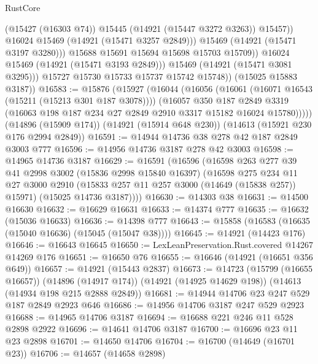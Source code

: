 \begin{lexlean}{RustCore}
\begin{coremodule}
                          (@15427 (@16303 @74))
                          @15445
                          (@14921 (@15447 @3272 @3263))
                          @15457))
                      @16024
                      @15469
                      (@14921 (@15471 @3257 @2849)))
                    @15469
                    (@14921 (@15471 @3197 @3280)))
                  @15688
                  @15691
                  @15694
                  @15698
                  @15703
                  @15709))
              @16024
              @15469
              (@14921 (@15471 @3193 @2849)))
            @15469
            (@14921 (@15471 @3081 @3295)))
          @15727
          @15730
          @15733
          @15737
          @15742
          @15748))
      (@15025 @15883 @3187))
@16583 := @15876
    (@15927
      (@16044
        (@16056
          (@16061 (@16071 @16543 (@15211 (@15213 @301 @187 @3078))))
          (@16057
            @350
            @187
            @2849
            @3319
            (@16063 @198 @187 @234 @27 @2849 @2910 @3317 @15182 @16024 @15780)))))
    (@14896 (@15909 @174))
    (@14921 (@15914 @648 @230))
    (@14613 (@15921 @230 @176 @2994 @2849))
@16591 := @14944 @14736 @38 @278 @42 @187 @2849 @3003 @777
@16596 := @14956 @14736 @3187 @278 @42 @3003
@16598 := @14965 @14736 @3187
@16629 := @16591
    (@16596
      (@16598
        @263
        @277
        @39
        @41
        @2998
        @3002
        (@15836 @2998 @15840 @16397)
        (@16598
          @275
          @234
          @11
          @27
          @3000
          @2910
          (@15833 @257 @11 @257 @3000 (@14649 (@15838 @257)) @15971)
          (@15025 @14736 @3187))))
@16630 := @14303 @38
@16631 := @14500 @16630
@16632 := @16629 @16631
@16633 := @14374 @777
@16635 := @16632 (@15036 @16633)
@16636 := @14398 @777
@16643 := @15858 (@16583 (@16635 (@15040 @16636) (@15045 (@15047 @38))))
@16645 := @14921 (@14423 @176)
@16646 := @16643 @16645
@16650 := LexLeanPreservation.Rust.covered @14267 @14269 @176
@16651 := @16650 @76
@16655 := @16646 (@14921 (@16651 @356 @649))
@16657 := @14921 (@15443 @2837)
@16673 := @14723
    (@15799 (@16655 @16657))
    (@14896 (@14917 @174))
    (@14921 (@14925 @14629 @198))
    (@14613 (@14934 @198 @215 @2888 @2849))
@16681 := @14944 @14706 @23 @247 @529 @187 @2849 @2923 @646
@16686 := @14956 @14706 @3187 @247 @529 @2923
@16688 := @14965 @14706 @3187
@16694 := @16688 @221 @246 @11 @528 @2898 @2922
@16696 := @14641 @14706 @3187
@16700 := @16696 @23 @11 @23 @2898
@16701 := @14650 @14706
@16704 := @16700 (@14649 (@16701 @23))
@16706 := @14657 (@14658 @2898)

\end{coremodule}
\end{lexlean}
